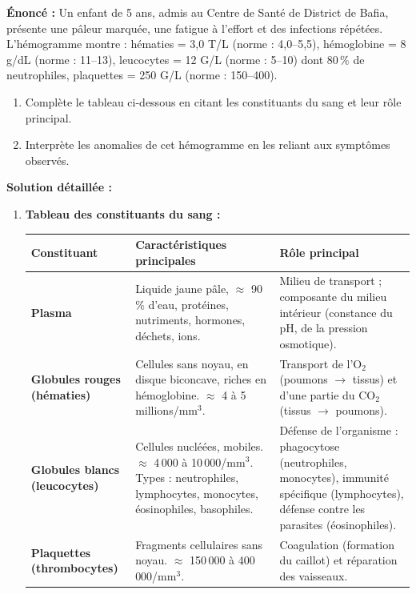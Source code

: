 \documentclass[11pt]{article}
\newcommand{\cle}[1]{{\popxbold\color{popdark}#1}}
\begin{document}
\begin{exoresolu}
    \textbf{Énoncé :} Un enfant de 5 ans, admis au Centre de Santé de District de Bafia, présente une pâleur marquée, une fatigue à l'effort et des infections répétées. L'hémogramme montre : hématies = 3,0 T/L (norme : 4,0--5,5), hémoglobine = 8 g/dL (norme : 11--13), leucocytes = 12 G/L (norme : 5--10) dont 80\,\% de neutrophiles, plaquettes = 250 G/L (norme : 150--400).
    \begin{enumerate}
        \item Complète le tableau ci-dessous en citant les constituants du sang et leur rôle principal.
        \item Interprète les anomalies de cet hémogramme en les reliant aux symptômes observés.
    \end{enumerate}
    \tcblower
    \textbf{Solution détaillée :}
    \begin{enumerate}
        \item \textbf{Tableau des constituants du sang :}
        \begin{center}
        \begin{tabularx}{\linewidth}{|l|X|X|}\hline
        \rowcolor{popblueL}
        \textbf{Constituant} & \textbf{Caractéristiques principales} & \textbf{Rôle principal} \\ \hline
        \textbf{Plasma} & Liquide jaune pâle, $\approx$ 90\,\% d'eau, protéines, nutriments, hormones, déchets, ions. & Milieu de transport ; composante du \cle{milieu intérieur} (constance du pH, de la pression osmotique). \\ \hline
        \textbf{Globules rouges (hématies)} & Cellules sans noyau, en disque biconcave, riches en \cle{hémoglobine}. $\approx$ 4 à 5 millions/mm$^3$. & Transport de l'\cle{O$_2$} (poumons $\rightarrow$ tissus) et d'une partie du \cle{CO$_2$} (tissus $\rightarrow$ poumons). \\ \hline
        \textbf{Globules blancs (leucocytes)} & Cellules nucléées, mobiles. $\approx$ 4\,000 à 10\,000/mm$^3$. Types : neutrophiles, lymphocytes, monocytes, éosinophiles, basophiles. & \cle{Défense de l'organisme} : phagocytose (neutrophiles, monocytes), immunité spécifique (lymphocytes), défense contre les parasites (éosinophiles). \\ \hline
        \textbf{Plaquettes (thrombocytes)} & Fragments cellulaires sans noyau. $\approx$ 150\,000 à 400\,000/mm$^3$. & \cle{Coagulation} (formation du caillot) et réparation des vaisseaux. \\ \hline

\end{tabularx}
\end{center}
\end{enumerate}
\end{exoresolu}
\end{document}
